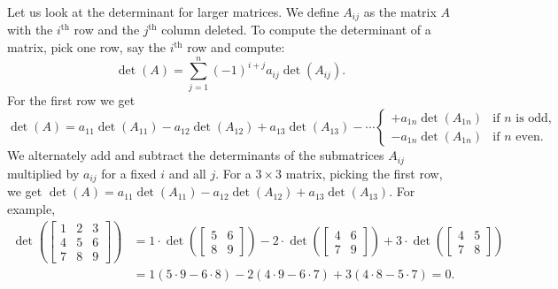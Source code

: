 \documentclass{ximera}
\begin{document}
Let us look at the determinant for larger matrices.  We define $A_{ij}$ as the matrix $A$ with the $i^{\text{th}}$ row and the $j^{\text{th}}$ column deleted.  To compute the determinant of a matrix, pick one row, say the $i^{\text{th}}$ row and compute:
\begin{equation*}
    \det (A) = \sum_{j=1}^n {(-1)}^{i+j} a_{ij} \det (A_{ij}) .
\end{equation*}
For the first row we get
\begin{equation*}
    \det (A) = a_{11} \det (A_{11}) - a_{12} \det (A_{12}) +  a_{13} \det (A_{13}) -  \cdots
    \begin{cases}
        + a_{1n} \det (A_{1n}) & \text{if } n \text{ is odd,} \\
        - a_{1n} \det (A_{1n}) & \text{if } n \text{ even.}
    \end{cases}
\end{equation*}
We alternately add and subtract the determinants of the submatrices $A_{ij}$ multiplied by $a_{ij}$ for a fixed $i$ and all $j$. For a $3 \times 3$ matrix, picking the first row, we get $\det (A) = a_{11} \det (A_{11}) - a_{12} \det (A_{12}) + a_{13} \det (A_{13})$.  For example,
\begin{equation*}
    \begin{split}
        \det \left(
        \begin{bmatrix}
            1 & 2 & 3 \\
            4 & 5 & 6 \\
            7 & 8 & 9
        \end{bmatrix}
        \right) & = 1 \cdot \det \left(
        \begin{bmatrix}
            5 & 6 \\
            8 & 9
        \end{bmatrix}
        \right) - 2 \cdot \det \left(
        \begin{bmatrix}
            4 & 6 \\
            7 & 9
        \end{bmatrix}
        \right) + 3 \cdot \det \left(
        \begin{bmatrix}
            4 & 5 \\
            7 & 8
        \end{bmatrix}
        \right) \\
        & = 1 (5 \cdot 9 - 6 \cdot 8) - 2 (4 \cdot 9 - 6 \cdot 7) + 3 (4 \cdot 8 - 5 \cdot 7) = 0 .
    \end{split}
\end{equation*}
\end{document}
